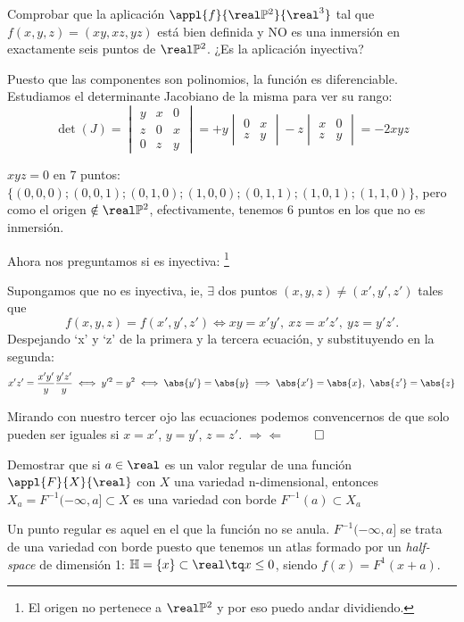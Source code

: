 \begin{problem}[12]
Comprobar que la aplicación $\appl{f}{\real \mathbb{P}^2}{\real^3}$ tal que $f(x,y,z)=(xy,xz,yz)$ está bien definida y NO es una inmersión en exactamente seis puntos de $\real \mathbb{P}^2$. ¿Es la aplicación inyectiva?
\solution


Puesto que las componentes son polinomios, la función es diferenciable. Estudiamos el determinante Jacobiano de la misma para ver su rango:
\[ \det(J)= \begin{vmatrix}
                   y & x & 0 \\
                   z & 0 & x \\
                   0 & z & y
             \end{vmatrix}
                 =
+ y \begin{vmatrix}
            0 & x \\
            z & y
     \end{vmatrix}
                  -z \begin{vmatrix}
                             x & 0 \\
                             z & y
                       \end{vmatrix}
= - 2 xyz
\]

$xyz = 0$ en 7 puntos: $\lbrace (0,0,0); (0,0,1); (0,1,0); (1,0,0); (0,1,1); (1,0,1); (1,1,0) \rbrace$, pero como el origen $\notin \real \mathbb{P}^2$, efectivamente, tenemos 6 puntos en los que no es inmersión.

Ahora nos preguntamos si es inyectiva: \footnote{El origen no pertenece a $\real \mathbb{P}^2$ y por eso puedo andar dividiendo.}

Supongamos que no es inyectiva, ie, $\exists$ dos puntos $(x,y,z) \neq (x',y',z')$ tales que
\[ f(x,y,z) = f(x',y',z') \iff xy=x'y',\ xz = x'z', \ yz = y' z'.\]
Despejando `x' y `z' de la primera y la tercera ecuación, y substituyendo en la segunda:
\[ x'z' = \frac{x'y'}{y} \frac{y' z'}{y} \iff y'^2 = y ^2 \iff \abs{y'} = \abs{y} \implies \abs{x'} = \abs{x},\ \abs{z'} = \abs{z} \]

Mirando con nuestro tercer ojo las ecuaciones podemos convencernos de que solo pueden ser iguales si $x=x'$, $y=y'$, $z=z'$. $\Rightarrow \Leftarrow$
$\hfill \qed$
\end{problem}

\begin{problem}[13]
Demostrar que si $a \in \real$ es un valor regular de una función $\appl{F}{X}{\real}$ con $X$ una variedad n-dimensional, entonces $X_a= F^{-1}(-\infty, a] \subset X$ es una variedad con borde $F^{-1}(a) \subset X_a$
\solution


Un punto regular es aquel en el que la función no se anula. $F^{-1}(-\infty,a]$ se trata de una variedad con borde puesto que tenemos un atlas formado por un \textit{half-space} de dimensión 1: $\mathbb{H}=\{x\}\subset \real \tq x \leq 0$, siendo $f(x)=F^{1}(x+a)$.
\end{problem}

